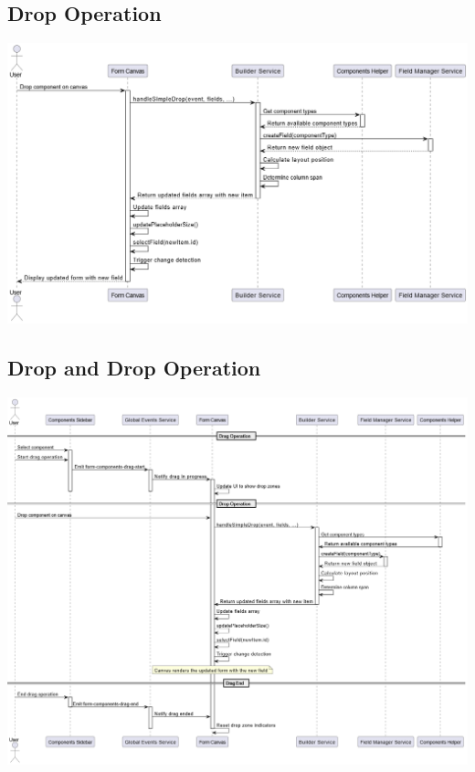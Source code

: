 \documentclass[a4paper,11pt]{article}
\begin{document}
\subsection{ Drop Operation}
\includegraphics[width=1.1\textwidth]{drop.drawio}
\newpage

\subsection{ Drop and Drop Operation}
\includegraphics[width=1.1\textwidth]{DragAndDrop.drawio}
\newpage
\end{document}
